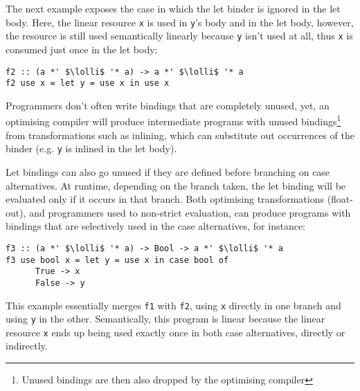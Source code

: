 \documentclass[acmsmall,review]{acmart}
\newcommand{\incode}[1]{\lstinline{#1}}
\newcommand{\lolli}{\multimap}
\begin{document}
The next example exposes the case in which the let binder is ignored in the let
body. Here, the linear resource \incode{x} is used in \incode{y}'s body and in the let
body, however, the resource is still used semantically linearly
because \incode{y} isn't used at all, thus \incode{x} is consumed just
once in the let body: 
%
\begin{notyet}
\begin{lstlisting}
f2 :: (a *' $\lolli$ '* a) -> a *' $\lolli$ '* a
f2 use x = let y = use x in use x
\end{lstlisting}
\end{notyet}
%
Programmers don't often write bindings that are completely unused, yet, an
optimising compiler will produce intermediate programs with unused bindings\footnote{Unused bindings are then
also dropped by the optimising compiler} 
from transformations such as inlining, which can substitute out occurrences
of the binder (e.g. \incode{y} is inlined in the let body).

Let bindings can also go unused if they are defined before branching on case
alternatives. At runtime, depending on the branch taken, the let binding will
be evaluated only if it occurs in that branch.
Both optimising transformations (float-out), and programmers used to non-strict evaluation, can produce
programs with bindings that are selectively used in the case alternatives, for
instance:
%
\begin{notyet}
\begin{lstlisting}
f3 :: (a *' $\lolli$ '* a) -> Bool -> a *' $\lolli$ '* a
f3 use bool x = let y = use x in case bool of
      True -> x 
      False -> y
\end{lstlisting}
\end{notyet}
%
This example essentially merges \lstinline{f1} with \lstinline{f2}, using \lstinline{x} directly in one
branch and using \lstinline{y} in the other. Semantically, this program is linear because
the linear resource \lstinline{x} ends up being used exactly once in both case
alternatives, directly or indirectly.
\end{document}
